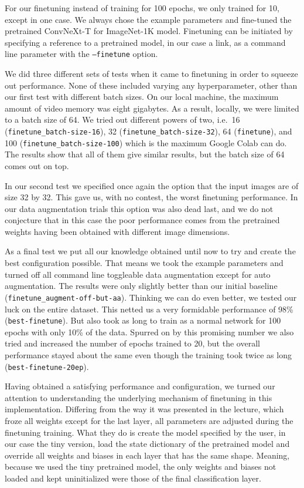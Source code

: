 \documentclass{article}
\begin{document}
For our finetuning instead of training for 100 epochs, we only trained for 10, except in one case.
We always chose the example parameters and fine-tuned the pretrained ConvNeXt-T for ImageNet-1K model\cite{repository}.
Finetuning can be initiated by specifying a reference to a pretrained model, in our case a link, as a command line parameter with the \texttt{--finetune} option.

We did three different sets of tests when it came to finetuning in order to squeeze out performance.
None of these included varying any hyperparameter, other than our first test with different batch sizes.
On our local machine, the maximum amount of video memory was eight gigabytes.
As a result, locally, we were limited to a batch size of 64.
We tried out different powers of two, i.e.\ 16 (\texttt{finetune\_batch-size-16}), 32 (\texttt{finetune\_batch-size-32}), 64 (\texttt{finetune}), and 100 (\texttt{finetune\_batch-size-100}) which is the maximum Google Colab can do.
The results show that all of them give similar results, but the batch size of 64 comes out on top.

In our second test we specified once again the option that the input images are of size 32 by 32.
This gave us, with no contest, the worst finetuning performance.
In our data augmentation trials this option was also dead last, and we do not conjecture that in this case the poor performance comes from the pretrained weights having been obtained with different image dimensions.

As a final test we put all our knowledge obtained until now to try and create the best configuration possible.
That means we took the example parameters and turned off all command line toggleable data augmentation except for auto augmentation.
The results were only slightly better than our initial baseline (\texttt{finetune\_augment-off-but-aa}).
Thinking we can do even better, we tested our luck on the entire dataset.
This netted us a very formidable performance of 98\% (\texttt{best-finetune}).
But also took as long to train as a normal network for 100 epochs with only 10\% of the data.
Spurred on by this promising number we also tried and increased the number of epochs trained to 20, but the overall performance stayed about the same even though the training took twice as long (\texttt{best-finetune-20ep}).

Having obtained a satisfying performance and configuration, we turned our attention to understanding the underlying mechanism of finetuning in this implementation.
Differing from the way it was presented in the lecture, which froze all weights except for the last layer, all parameters are adjusted during the finetuning training.
What they do is create the model specified by the user, in our case the tiny version, load the state dictionary of the pretrained model and override all weights and biases in each layer that has the same shape.
Meaning, because we used the tiny pretrained model, the only weights and biases not loaded and kept uninitialized were those of the final classification layer.
\end{document}
